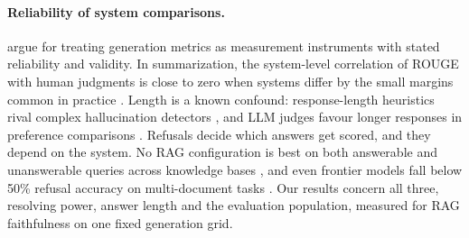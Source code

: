 \paragraph{Reliability of system comparisons.}
\citet{xiao-etal-2023} argue for treating generation metrics as measurement instruments with stated reliability and validity. In summarization, the system-level correlation of ROUGE with human judgments is close to zero when systems differ by the small margins common in practice \citep{deutsch-etal-2022-examining}. Length is a known confound: response-length heuristics rival complex hallucination detectors \citep{janiak-etal-2025-illusion}, and LLM judges favour longer responses in preference comparisons \citep{hu-etal-2025-explaining}. Refusals decide which answers get scored, and they depend on the system. No RAG configuration is best on both answerable and unanswerable queries across knowledge bases \citep{peng-etal-2025-unanswerability}, and even frontier models fall below 50\% refusal accuracy on multi-document tasks \citep{muhamed-etal-2026-refusalbench}. Our results concern all three, resolving power, answer length and the evaluation population, measured for RAG faithfulness on one fixed generation grid.
